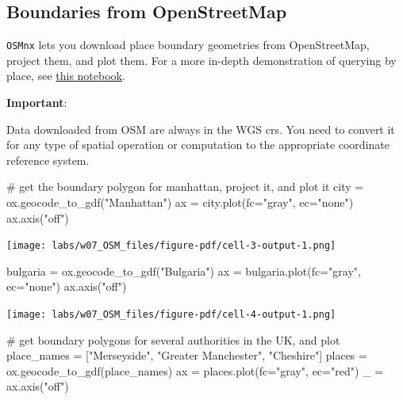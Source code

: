 \documentclass[
  letterpaper,
  DIV=11,
  numbers=noendperiod]{scrreprt}
\newenvironment{Shaded}{\begin{snugshade}}{\end{snugshade}}
\newcommand{\CommentTok}[1]{\textcolor[rgb]{0.37,0.37,0.37}{#1}}
\newcommand{\NormalTok}[1]{\textcolor[rgb]{0.00,0.23,0.31}{#1}}
\newcommand{\OperatorTok}[1]{\textcolor[rgb]{0.37,0.37,0.37}{#1}}
\newcommand{\StringTok}[1]{\textcolor[rgb]{0.13,0.47,0.30}{#1}}
\begin{document}
\subsection{Boundaries from
OpenStreetMap}\label{boundaries-from-openstreetmap}

\texttt{OSMnx} lets you download place boundary geometries from
OpenStreetMap, project them, and plot them. For a more in-depth
demonstration of querying by place, see
\href{03-graph-place-queries.ipynb}{this notebook}.

\textbf{Important}:

Data downloaded from OSM are always in the WGS crs. You need to convert
it for any type of spatial operation or computation to the appropriate
coordinate reference system.

\begin{Shaded}
\begin{Highlighting}[]
\CommentTok{\# get the boundary polygon for manhattan, project it, and plot it}
\NormalTok{city }\OperatorTok{=}\NormalTok{ ox.geocode\_to\_gdf(}\StringTok{"Manhattan"}\NormalTok{)}
\NormalTok{ax }\OperatorTok{=}\NormalTok{ city.plot(fc}\OperatorTok{=}\StringTok{"gray"}\NormalTok{, ec}\OperatorTok{=}\StringTok{"none"}\NormalTok{)}
\NormalTok{ax.axis(}\StringTok{"off"}\NormalTok{)}
\end{Highlighting}
\end{Shaded}

\texttt{[image: labs/w07\_OSM\_files/figure-pdf/cell-3-output-1.png]}

\begin{Shaded}
\begin{Highlighting}[]
\NormalTok{bulgaria }\OperatorTok{=}\NormalTok{ ox.geocode\_to\_gdf(}\StringTok{"Bulgaria"}\NormalTok{)}
\NormalTok{ax }\OperatorTok{=}\NormalTok{ bulgaria.plot(fc}\OperatorTok{=}\StringTok{"gray"}\NormalTok{, ec}\OperatorTok{=}\StringTok{"none"}\NormalTok{)}
\NormalTok{ax.axis(}\StringTok{"off"}\NormalTok{)}
\end{Highlighting}
\end{Shaded}

\texttt{[image: labs/w07\_OSM\_files/figure-pdf/cell-4-output-1.png]}

\begin{Shaded}
\begin{Highlighting}[]
\CommentTok{\# get boundary polygons for several authorities in the UK, and plot}
\NormalTok{place\_names }\OperatorTok{=}\NormalTok{ [}\StringTok{"Merseyside"}\NormalTok{, }\StringTok{"Greater Manchester"}\NormalTok{, }\StringTok{"Cheshire"}\NormalTok{]}
\NormalTok{places }\OperatorTok{=}\NormalTok{ ox.geocode\_to\_gdf(place\_names)}
\NormalTok{ax }\OperatorTok{=}\NormalTok{ places.plot(fc}\OperatorTok{=}\StringTok{"gray"}\NormalTok{, ec}\OperatorTok{=}\StringTok{"red"}\NormalTok{)}
\NormalTok{\_ }\OperatorTok{=}\NormalTok{ ax.axis(}\StringTok{"off"}\NormalTok{)}
\end{Highlighting}
\end{Shaded}
\end{document}
